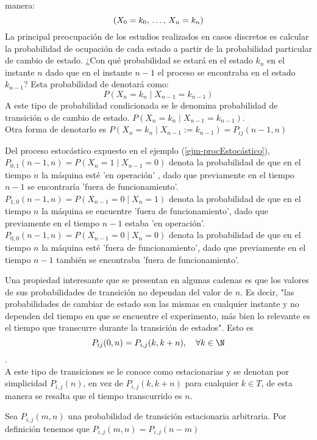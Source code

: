 manera: $$(X_0=k_0,\thinspace\ldots,\thinspace X_n=k_n)$$
La principal preocupación de los estudios realizados en casos discretos es calcular la probabilidad de ocupación de cada estado a partir de la probabilidad particular de cambio de estado. ¿Con qué probabilidad se estará en el estado $k_n$ en el instante $n$ dado que en el instante $n-1$ el proceso se encontraba en el estado $k_{n-1}$? Esta probabilidad de denotará como:
$$P(X_n = k_n\mid X_{n-1} = k_{n-1})$$
A este tipo de probabilidad condicionada se le denomina probabilidad de transición o de cambio de estado. $P(X_n = k_n\mid X_{n-1} = k_{n-1})$. \\Otra forma de denotarlo es $P(X_n = k_n \mid X_{n-1} := k_{n-1})=P_{i j}{(n-1,n)}$
\begin{Ejm}
    Del proceso estocástico expuesto en el ejemplo (\ref{ejm-procEstocástico}), \\$P_{0,1}(n-1,n)=P(X_n=1\mid X_{n-1}=0)$ denota la probabilidad de que en el tiempo $n$ la máquina esté 'en operación' , dado que previamente en el tiempo $n-1$ se encontraría 'fuera de funcionamiento'.\\
    $P_{1,0}(n-1,n)=P(X_{n-1}=0\mid X_n=1)$ denota la probabilidad de que en el tiempo $n$ la máquina se encuentre 'fuera de funcionamiento', dado que previamente en el tiempo $n-1$ estaba 'en operación'.\\
    $P_{0,0}(n-1,n)=P(X_{n-1}=0\mid X_n=0)$ denota la probabilidad de que en el tiempo $n$ la máquina esté 'fuera de funcionamiento', dado que previamente en el tiempo $n-1$ también se encontraba 'fuera de funcionamiento'.
\end{Ejm}
Una propiedad interesante que se presentan en algunas cadenas es que los valores de sus probabilidades de transición no dependan del valor de $n$. Es decir, "las probabilidades de cambiar de estado son las mismas en cualquier instante y no dependen del tiempo en que se encuentre el experimento, más bien lo relevante es el tiempo que transcurre durante la transición de estados". Esto es $$P_{i j}(0,n)=P_{i,j}(k,k+n),\quad \forall k\in\N$$.\\
A este tipo de transiciones se le conoce como estacionarias y se denotan por simplicidad $P_{i,j}(n)$, en vez de $P_{i,j}(k,k+n)$ para cualquier $k\in T$, de esta manera se resalta que el tiempo transcurrido es $n$.\\
\begin{Obs}
    Sea $P_{i,j}(m,n)$ una probabilidad de transición estacionaria arbitraria. Por definición tenemos que $P_{i,j}(m,n)=P_{i,j}(n-m)$
\end{Obs}
